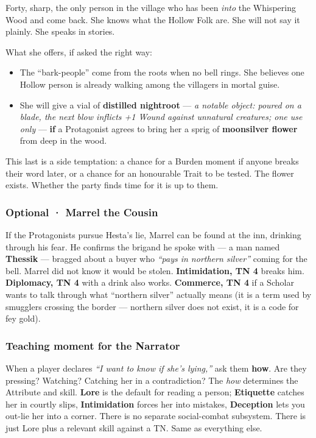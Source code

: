 \documentclass[10pt,a4paper]{article}
\newcommand{\tightlist}{\setlength{\itemsep}{0pt}\setlength{\parskip}{0pt}}
\begin{document}
Forty, sharp, the only person in the village who has been \emph{into} the Whispering Wood and come back. She knows what the Hollow Folk are. She will not say it plainly. She speaks in stories.

What she offers, if asked the right way:

\begin{itemize}
\tightlist
\item
  The “bark-people” come from the roots when no bell rings. She believes one Hollow person is already walking among the villagers in mortal guise.
\item
  She will give a vial of \textbf{distilled nightroot} --- \emph{a notable object: poured on a blade, the next blow inflicts +1 Wound against unnatural creatures; one use only} --- \textbf{if} a Protagonist agrees to bring her a sprig of \textbf{moonsilver flower} from deep in the wood.
\end{itemize}

This last is a side temptation: a chance for a Burden moment if anyone breaks their word later, or a chance for an honourable Trait to be tested. The flower exists. Whether the party finds time for it is up to them.

\subsubsection{Optional · Marrel the Cousin}\label{optional--marrel-the-cousin}

If the Protagonists pursue Hesta’s lie, Marrel can be found at the inn, drinking through his fear. He confirms the brigand he spoke with --- a man named \textbf{Thessik} --- bragged about a buyer who \emph{“pays in northern silver”} coming for the bell. Marrel did not know it would be stolen. \textbf{Intimidation, TN 4} breaks him. \textbf{Diplomacy, TN 4} with a drink also works. \textbf{Commerce, TN 4} if a Scholar wants to talk through what “northern silver” actually means (it is a term used by smugglers crossing the border --- northern silver does not exist, it is a code for fey gold).

\subsubsection{Teaching moment for the Narrator}\label{teaching-moment-for-the-narrator}

When a player declares \emph{“I want to know if she’s lying,”} ask them \textbf{how}. Are they pressing? Watching? Catching her in a contradiction? The \emph{how} determines the Attribute and skill. \textbf{Lore} is the default for reading a person; \textbf{Etiquette} catches her in courtly slips, \textbf{Intimidation} forces her into mistakes, \textbf{Deception} lets you out-lie her into a corner. There is no separate social-combat subsystem. There is just Lore plus a relevant skill against a TN. Same as everything else.
\end{document}
